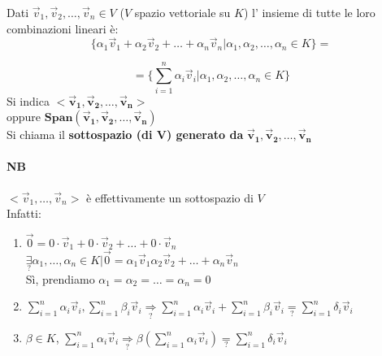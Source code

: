 Dati $\vec{v}_1,\vec{v}_2, \dots, \vec{v}_n\in V$ ($V$ spazio vettoriale
su $K$) l' insieme di tutte le loro combinazioni lineari è: 
\[
    \{\alpha_1\vec{v}_1 + \alpha_2\vec{v}_2+\dots+\alpha_n\vec{v}_n\big|\alpha_1,\alpha_2,\dots
    ,\alpha_n\in K\}=
\]
    
\[
    =\Big\{\sum_{i=1}^{n}\alpha_i\vec{v}_i\big|\alpha_1,\alpha_2,\dots,\alpha_n\in K\Big\}
\]
Si indica $\pmb{<\vec{v}_1,\vec{v}_2,\dots,\vec{v}_n>}$\\
oppure $\pmb{Span(\vec{v}_1,\vec{v}_2,\dots,\vec{v}_n)}$\\
Si chiama il \textbf{sottospazio (di $\pmb{V}$) generato da }
$\pmb{\vec{v}_1, \vec{v}_2,\dots,\vec{v}_n}$

\paragraph{NB} $<\vec{v}_1,\dots,\vec{v}_n>$ è effettivamente un sottospazio di $V$\\
Infatti: 
\begin{enumerate}
    \item $\vec{0}=0\cdot\vec{v}_1+0\cdot\vec{v}_2+\dots+0\cdot\vec{v}_n$\\
        $\underset{?}{\exists}\alpha_1,\dots, \alpha_n\in K|\vec{0}=\alpha_1\vec{v}_1 
        \alpha_2\vec{v}_2+\dots+\alpha_n\vec{v}_n$\\
        {\color{red} Sì, prendiamo
        $ 
            \alpha_1=\alpha_2=\dots=\alpha_n=0
        $ 
        }
    \item 
        $ 
        \sum_{i=1}^{n}\alpha_i\vec{v}_i, 
        \sum_{i=1}^{n}\beta_i\vec{v}_i 
        \underset{?}{\Longrightarrow}
        \sum_{i=1}^{n}\alpha_i\vec{v}_i + 
        \sum_{i=1}^{n}\beta_i\vec{v}_i 
        \underset{?}{=}
        \sum_{i=1}^{n}\delta_i\vec{v}_i 
        $
    \item $\beta\in K$, $\sum_{i=1}^{n}\alpha_i\vec{v}_i
        \underset{?}{\Longrightarrow}
        \beta(\sum_{i=1}^{n}\alpha_i\vec{v}_i)\underset{?}{=}
        \sum_{i=1}^{n}\delta_i\vec{v}_i$
\end{enumerate}
